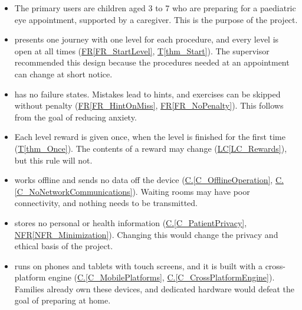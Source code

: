 \documentclass[12pt]{article}
\newcommand{\conref}[1]{\hyperref[#1]{C.\ref*{#1}}}
\newcommand{\rref}[1]{\hyperref[#1]{FR\ref*{#1}}}
\newcommand{\nfrref}[1]{\hyperref[#1]{NFR\ref*{#1}}}
\newcommand{\thmref}[1]{\hyperref[#1]{T\ref*{#1}}}
\newcounter{lcnum} %
\newcommand{\lcref}[1]{\hyperref[#1]{LC\ref*{#1}}}
\newcounter{ulcnum} %
\begin{document}
\noindent \begin{itemize}

\item[\refstepcounter{ulcnum}\textbf{ULC\theulcnum}\label{ULC_Users}:]
The primary users are children aged 3 to 7 who are preparing for a paediatric
eye appointment, supported by a caregiver. This is the purpose of the project.

\item[\refstepcounter{ulcnum}\textbf{ULC\theulcnum}\label{ULC_Journey}:]
\progname{} presents one journey with one level for each procedure, and every
level is open at all times (\rref{FR_StartLevel}, \thmref{thm_Start}). The
supervisor recommended this design because the procedures needed at an
appointment can change at short notice.

\item[\refstepcounter{ulcnum}\textbf{ULC\theulcnum}\label{ULC_NoFail}:]
\progname{} has no failure states. Mistakes lead to hints, and exercises can be
skipped without penalty (\rref{FR_HintOnMiss}, \rref{FR_NoPenalty}). This
follows from the goal of reducing anxiety.

\item[\refstepcounter{ulcnum}\textbf{ULC\theulcnum}\label{ULC_RewardOnce}:]
Each level reward is given once, when the level is finished for the first time
(\thmref{thm_Once}). The contents of a reward may change (\lcref{LC_Rewards}),
but this rule will not.

\item[\refstepcounter{ulcnum}\textbf{ULC\theulcnum}\label{ULC_Offline}:]
\progname{} works offline and sends no data off the device
(\conref{C_OfflineOperation}, \conref{C_NoNetworkCommunications}). Waiting
rooms may have poor connectivity, and nothing needs to be transmitted.

\item[\refstepcounter{ulcnum}\textbf{ULC\theulcnum}\label{ULC_NoPersonalInfo}:]
\progname{} stores no personal or health information
(\conref{C_PatientPrivacy}, \nfrref{NFR_Minimization}). Changing this would
change the privacy and ethical basis of the project.

\item[\refstepcounter{ulcnum}\textbf{ULC\theulcnum}\label{ULC_Mobile}:]
\progname{} runs on phones and tablets with touch screens, and it is built
with a cross-platform engine (\conref{C_MobilePlatforms},
\conref{C_CrossPlatformEngine}). Families already own these devices, and
dedicated hardware would defeat the goal of preparing at home.


\end{itemize}
\end{document}

